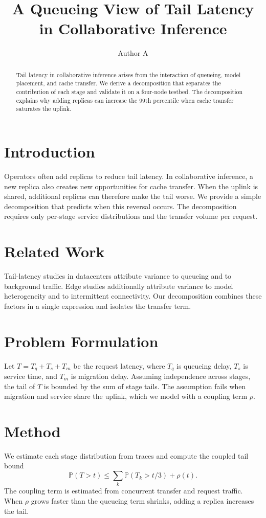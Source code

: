 \documentclass[conference]{IEEEtran}
\title{A Queueing View of Tail Latency in Collaborative Inference}
\author{Author A}
\begin{document}
\maketitle

\begin{abstract}
Tail latency in collaborative inference arises from the interaction of queueing, model placement, and cache transfer.
We derive a decomposition that separates the contribution of each stage and validate it on a four-node testbed.
The decomposition explains why adding replicas can increase the 99th percentile when cache transfer saturates the uplink.
\end{abstract}

\section{Introduction}
\label{sec:intro}
Operators often add replicas to reduce tail latency.
In collaborative inference, a new replica also creates new opportunities for cache transfer.
When the uplink is shared, additional replicas can therefore make the tail worse.
We provide a simple decomposition that predicts when this reversal occurs.
The decomposition requires only per-stage service distributions and the transfer volume per request.

\section{Related Work}
\label{sec:related}
Tail-latency studies in datacenters attribute variance to queueing and to background traffic.
Edge studies additionally attribute variance to model heterogeneity and to intermittent connectivity.
Our decomposition combines these factors in a single expression and isolates the transfer term.

\section{Problem Formulation}
\label{sec:problem}
Let $T = T_q + T_s + T_m$ be the request latency, where $T_q$ is queueing delay, $T_s$ is service time, and $T_m$ is migration delay.
Assuming independence across stages, the tail of $T$ is bounded by the sum of stage tails.
The assumption fails when migration and service share the uplink, which we model with a coupling term $\rho$.

\section{Method}
\label{sec:method}
We estimate each stage distribution from traces and compute the coupled tail bound
\begin{equation}
\label{eq:bound}
\mathbb{P}(T > t) \le \sum_{k} \mathbb{P}(T_k > t/3) + \rho(t).
\end{equation}
The coupling term is estimated from concurrent transfer and request traffic.
When $\rho$ grows faster than the queueing term shrinks, adding a replica increases the tail.
\end{document}
